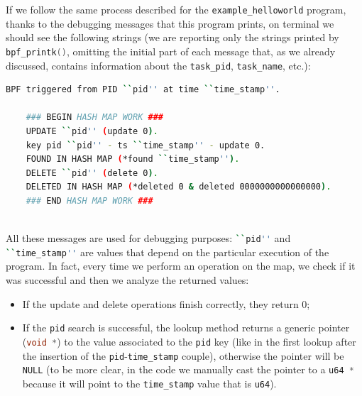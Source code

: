 If we follow the same process described for the \colorbox{backcolour}{\lstinline[style=highlight, language=bash]|example_helloworld|} program, thanks to the debugging messages that this program prints, on terminal we should see the following strings (we are reporting only the strings printed by \colorbox{backcolour}{\lstinline[style=cstyle, language=C]|bpf_printk()|}, omitting the initial part of each message that, as we already discussed, contains information about the \colorbox{backcolour}{\lstinline[style=cstyle, language=C]|task_pid|}, \colorbox{backcolour}{\lstinline[style=cstyle, language=C]|task_name|}, etc.):

\begin{lstlisting}[style=commandline, language=bash, caption={libbpf-bootstrap more complex program debugging messages}]
	BPF triggered from PID ``pid'' at time ``time_stamp''.
	
	### BEGIN HASH MAP WORK ###
	UPDATE ``pid'' (update 0).
	key pid ``pid'' - ts ``time_stamp'' - update 0.
	FOUND IN HASH MAP (*found ``time_stamp'').
	DELETE ``pid'' (delete 0).
	DELETED IN HASH MAP (*deleted 0 & deleted 0000000000000000).
	### END HASH MAP WORK ###
	
\end{lstlisting}

All these messages are used for debugging purposes:  \colorbox{backcolour}{\lstinline[style=highlight, language=bash]|``pid''|} and \colorbox{backcolour}{\lstinline[style=highlight, language=bash]|``time_stamp''|} are values that depend on the particular execution of the program.
In fact, every time we perform an operation on the map, we check if it was successful and then we analyze the returned values:

\begin{itemize}
	\item 
		If the update and delete operations finish correctly, they return 0;
	\item 
		If the \colorbox{backcolour}{\lstinline[style=cstyle, language=C]|pid|} search is successful, the lookup method returns a generic pointer (\colorbox{backcolour}{\lstinline[style=cstyle, language=C]|void *|}) to the value associated to the \colorbox{backcolour}{\lstinline[style=cstyle, language=C]|pid|} key (like in the first lookup after the insertion of the \colorbox{backcolour}{\lstinline[style=cstyle, language=C]|pid|}-\colorbox{backcolour}{\lstinline[style=cstyle, language=C]|time_stamp|} couple), otherwise the pointer will be \colorbox{backcolour}{\lstinline[style=cstyle, language=C]|NULL|} (to be more clear, in the code we manually cast the pointer to a \colorbox{backcolour}{\lstinline[style=cstyle, language=C]|u64 *|} because it will point to the \colorbox{backcolour}{\lstinline[style=cstyle, language=C]|time_stamp|} value that is \colorbox{backcolour}{\lstinline[style=cstyle, language=C]|u64|}).
\end{itemize}

